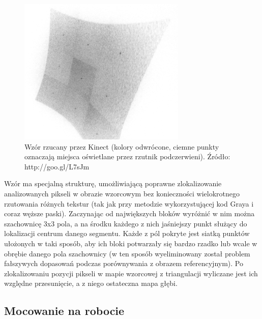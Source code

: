 \begin{figure}[h!]
\centering
\includegraphics[width=8cm]{../img/kinect_pattern}
\caption[Wzór rzucany przez Kinect]{Wzór rzucany przez Kinect (kolory odwrócone,
ciemne punkty oznaczają miejsca oświetlane przez rzutnik podczerwieni). Źródło:
http://goo.gl/L7sJm}
\label{fig:kinect_pattern}
\end{figure} 

Wzór ma specjalną strukturę, umożliwiającą poprawne zlokalizowanie analizowanych
pikseli w obrazie wzorcowym bez konieczności wielokrotnego rzutowania różnych
tekstur (tak jak przy metodzie wykorzystującej kod Graya i coraz węższe paski).
Zaczynając od największych bloków wyróżnić w nim można szachownicę 3x3 pola, a
na środku każdego z nich jaśniejszy punkt służący do lokalizacji centrum danego
segmentu. Każde z pól pokryte jest siatką punktów ułożonych w taki sposób, aby
ich bloki potwarzały się bardzo rzadko lub wcale w obrębie danego pola
szachownicy (w ten sposób wyeliminowany został problem fałszywych dopasowań
podczas porównywania z obrazem referencyjnym). Po zlokalizowaniu pozycji
pikseli w mapie wzorcowej z triangulacji wyliczane jest ich względne
przesunięcie, a z niego ostateczna mapa głębi.

\subsection{Mocowanie na robocie}

